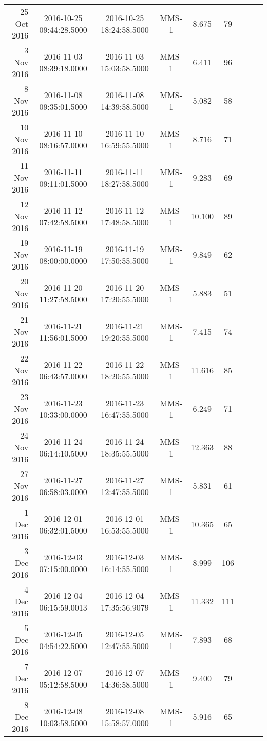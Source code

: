 \begin{longtable}{r|cccccccc}
25 Oct 2016    &  2016-10-25 09:44:28.5000 &  2016-10-25 18:24:58.5000 &  MMS-1 &    8.675 &     79 \\
3 Nov 2016     &  2016-11-03 08:39:18.0000 &  2016-11-03 15:03:58.5000 &  MMS-1 &    6.411 &     96 \\
8 Nov 2016     &  2016-11-08 09:35:01.5000 &  2016-11-08 14:39:58.5000 &  MMS-1 &    5.082 &     58 \\
10 Nov 2016    &  2016-11-10 08:16:57.0000 &  2016-11-10 16:59:55.5000 &  MMS-1 &    8.716 &     71 \\
11 Nov 2016    &  2016-11-11 09:11:01.5000 &  2016-11-11 18:27:58.5000 &  MMS-1 &    9.283 &     69 \\
12 Nov 2016    &  2016-11-12 07:42:58.5000 &  2016-11-12 17:48:58.5000 &  MMS-1 &   10.100 &     89 \\
19 Nov 2016    &  2016-11-19 08:00:00.0000 &  2016-11-19 17:50:55.5000 &  MMS-1 &    9.849 &     62 \\
20 Nov 2016    &  2016-11-20 11:27:58.5000 &  2016-11-20 17:20:55.5000 &  MMS-1 &    5.883 &     51 \\
21 Nov 2016    &  2016-11-21 11:56:01.5000 &  2016-11-21 19:20:55.5000 &  MMS-1 &    7.415 &     74 \\
22 Nov 2016    &  2016-11-22 06:43:57.0000 &  2016-11-22 18:20:55.5000 &  MMS-1 &   11.616 &     85 \\
23 Nov 2016    &  2016-11-23 10:33:00.0000 &  2016-11-23 16:47:55.5000 &  MMS-1 &    6.249 &     71 \\
24 Nov 2016    &  2016-11-24 06:14:10.5000 &  2016-11-24 18:35:55.5000 &  MMS-1 &   12.363 &     88 \\
27 Nov 2016    &  2016-11-27 06:58:03.0000 &  2016-11-27 12:47:55.5000 &  MMS-1 &    5.831 &     61 \\
1 Dec 2016     &  2016-12-01 06:32:01.5000 &  2016-12-01 16:53:55.5000 &  MMS-1 &   10.365 &     65 \\
3 Dec 2016     &  2016-12-03 07:15:00.0000 &  2016-12-03 16:14:55.5000 &  MMS-1 &    8.999 &    106 \\
4 Dec 2016     &  2016-12-04 06:15:59.0013 &  2016-12-04 17:35:56.9079 &  MMS-1 &   11.332 &    111 \\
5 Dec 2016     &  2016-12-05 04:54:22.5000 &  2016-12-05 12:47:55.5000 &  MMS-1 &    7.893 &     68 \\
7 Dec 2016     &  2016-12-07 05:12:58.5000 &  2016-12-07 14:36:58.5000 &  MMS-1 &    9.400 &     79 \\
8 Dec 2016     &  2016-12-08 10:03:58.5000 &  2016-12-08 15:58:57.0000 &  MMS-1 &    5.916 &     65 \\

\end{longtable}
